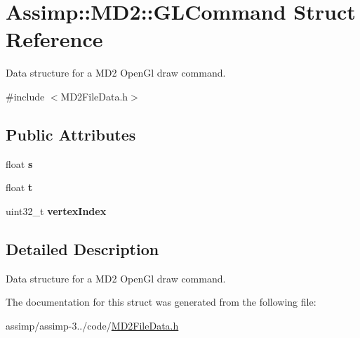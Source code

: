 \hypertarget{struct_assimp_1_1_m_d2_1_1_g_l_command}{\section{Assimp\+:\+:M\+D2\+:\+:G\+L\+Command Struct Reference}
\label{struct_assimp_1_1_m_d2_1_1_g_l_command}
}


Data structure for a M\+D2 Open\+Gl draw command.  




{\ttfamily \#include $<$M\+D2\+File\+Data.\+h$>$}

\subsection*{Public Attributes}
\begin{DoxyCompactItemize}
\item 
\hypertarget{struct_assimp_1_1_m_d2_1_1_g_l_command_a1796b07b8e625db2d6531301d5641c19}{float {\bfseries s}}\label{struct_assimp_1_1_m_d2_1_1_g_l_command_a1796b07b8e625db2d6531301d5641c19}

\item 
\hypertarget{struct_assimp_1_1_m_d2_1_1_g_l_command_a30a5b7d45b9aef291295e094857683b1}{float {\bfseries t}}\label{struct_assimp_1_1_m_d2_1_1_g_l_command_a30a5b7d45b9aef291295e094857683b1}

\item 
\hypertarget{struct_assimp_1_1_m_d2_1_1_g_l_command_ac9688d5aa8b866f45f3304f3fcdea19e}{uint32\+\_\+t {\bfseries vertex\+Index}}\label{struct_assimp_1_1_m_d2_1_1_g_l_command_ac9688d5aa8b866f45f3304f3fcdea19e}

\end{DoxyCompactItemize}


\subsection{Detailed Description}
Data structure for a M\+D2 Open\+Gl draw command. 

The documentation for this struct was generated from the following file\+:\begin{DoxyCompactItemize}
\item 
assimp/assimp-\/3../code/\hyperlink{_m_d2_file_data_8h}{M\+D2\+File\+Data.\+h}\end{DoxyCompactItemize}

